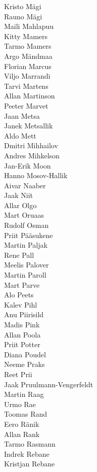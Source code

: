 \begin{multicols}{3}
Kristo Mägi\\
Rauno Mägi\\
Maili Mahlapuu\\
Kitty Mamers\\
Tarmo Mamers\\
Argo Mändmaa\\
Florian Marcus\\
Viljo Marrandi\\
Tarvi Martens\\
Allan Martinson\\
Peeter Marvet\\
Jaan Metsa\\
Janek Metsallik\\
Aldo Mett\\
Dmitri Mihhailov\\
Andres Mihkelson\\
Jan-Erik Moon\\
Hanno Mosov-Hallik\\
Aivar Naaber\\
Jaak Niit\\
Allar Olgo\\
Mart Oruaas\\
Rudolf Osman\\
Priit Pääsukene\\
Martin Paljak\\
Rene Pall\\
Meelis Palover\\
Martin Paroll\\
Mart Parve\\
Alo Peets\\
Kalev Pihl\\
Anu Piirisild\\
Madis Pink\\
Allan Poola\\
Priit Potter\\
Diana Poudel\\
Neeme Praks\\
Reet Prii\\
Jaak Pruulmann-Vengerfeldt\\
Martin Raag\\
Urmo Rae\\
Toomas Rand\\
Eero Ränik\\
Allan Rank\\
Tarmo Rasmann\\
Indrek Rebane\\
Kristjan Rebane\\

\end{multicols}
